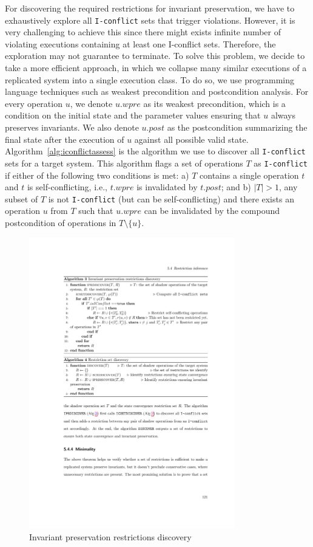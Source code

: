 For discovering the required restrictions for invariant preservation, we have
to exhaustively explore all {\tt I-conflict} sets that trigger violations. However,
it is very challenging to achieve this since there might exists infinite number of
violating executions containing at least one I-conflict sets. Therefore, the exploration may not guarantee to terminate.
To solve this problem, we decide to take a more efficient approach,
in which we collapse many similar executions of a replicated system into a single
execution class. To do so, we use programming language techniques such as
weakest precondition and postcondition analysis. For every operation $u$, we denote
$u.wpre$ as its weakest precondition, which is a condition on
the initial state and the parameter values ensuring that $u$
always preserves invariants. We also denote $u.post$ as the postcondition summarizing
the final state after the execution of $u$ against all possible valid state. Algorithm~\ref{alg:iconflictassess}
is the algorithm we use to discover all {\tt I-conflict} sets for a target system. This algorithm
flags a set of operations $T$ as {\tt I-conflict} if either of the following two conditions is met:
a) $T$ contains a single operation $t$ and $t$ is self-conflicting, i.e., $t.wpre$ is
invalidated by $t.post$; and b) $|T| > 1$, any subset of $T$ is not {\tt I-conflict} (but
can be self-conflicting) and there exists an operation $u$ from $T$ such that $u.wpre$
can be invalidated by the compound postcondition of operations in $T\setminus \{u\}$.

\begin{figure}[th!]
\centering
\includegraphics[width=0.8\textwidth]{figures/algs/alg3.pdf}
\caption{Invariant preservation restrictions discovery}
\label{alg:isdiscover}
\end{figure}

